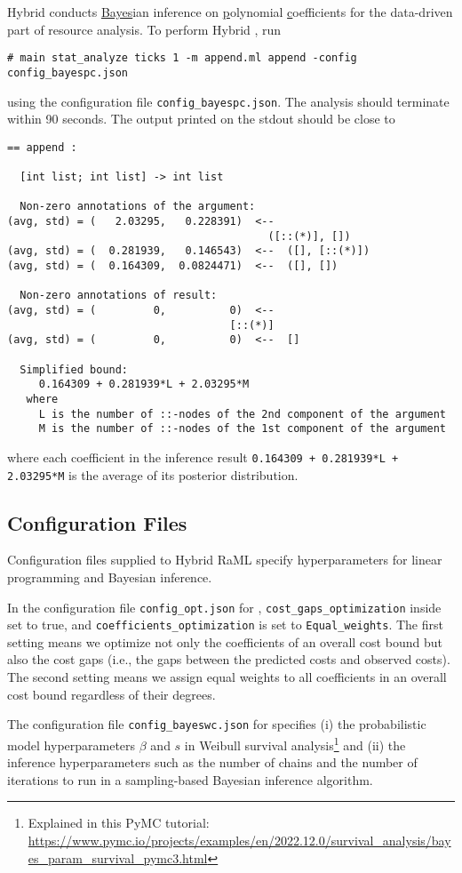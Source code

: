 Hybrid \BayesPC{} conducts \underline{Bayes}ian inference on
\underline{p}olynomial \underline{c}oefficients for the data-driven part of
resource analysis.
%
To perform Hybrid \BayesPC{}, run
\begin{verbatim}
# main stat_analyze ticks 1 -m append.ml append -config config_bayespc.json
\end{verbatim}
using the configuration file \texttt{config\_bayespc.json}.
%
The analysis should terminate within 90 seconds.
%
The output printed on the stdout should be close to
\begin{verbatim}
== append :

  [int list; int list] -> int list

  Non-zero annotations of the argument:
(avg, std) = (   2.03295,   0.228391)  <--
                                         ([::(*)], [])
(avg, std) = (  0.281939,   0.146543)  <--  ([], [::(*)])
(avg, std) = (  0.164309,  0.0824471)  <--  ([], [])

  Non-zero annotations of result:
(avg, std) = (         0,          0)  <--
                                   [::(*)]
(avg, std) = (         0,          0)  <--  []

  Simplified bound:
     0.164309 + 0.281939*L + 2.03295*M
   where
     L is the number of ::-nodes of the 2nd component of the argument
     M is the number of ::-nodes of the 1st component of the argument
\end{verbatim}
where each coefficient in the inference result \texttt{0.164309 + 0.281939*L +
  2.03295*M} is the average of its posterior distribution.

\subsection{Configuration Files}

Configuration files supplied to Hybrid RaML specify hyperparameters for
linear programming and Bayesian inference.

In the configuration file \texttt{config\_opt.json} for \Opt{},
\texttt{cost\_gaps\_optimization} inside set to true, and
\texttt{coefficients\_optimization} is set to \texttt{Equal\_weights}.
%
The first setting means we optimize not only the coefficients of an overall cost
bound but also the cost gaps (i.e., the gaps between the predicted costs and
observed costs).
%
The second setting means we assign equal weights to all coefficients in an
overall cost bound regardless of their degrees.

The configuration file \texttt{config\_bayeswc.json} for \BayesWC{} specifies
(i) the probabilistic model hyperparameters $\beta$ and $s$ in Weibull survival
analysis\footnote{Explained in this PyMC tutorial:
  \url{https://www.pymc.io/projects/examples/en/2022.12.0/survival_analysis/bayes_param_survival_pymc3.html}}
and (ii) the inference hyperparameters such as the number of chains and the
number of iterations to run in a sampling-based Bayesian inference algorithm.


